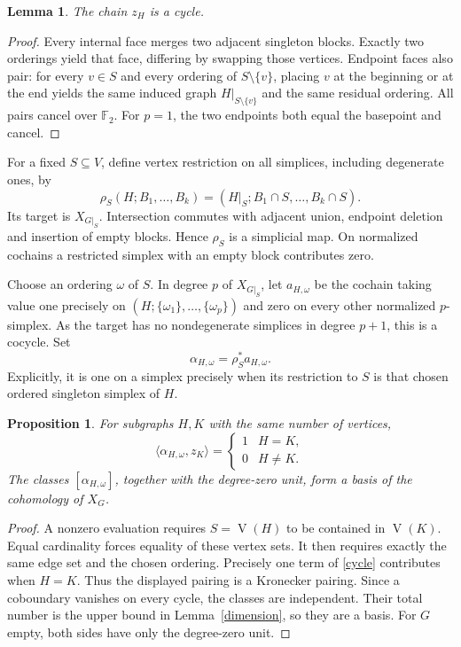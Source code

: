 \documentclass[11pt,a4paper]{article}
\newtheorem{lemma}[theorem]{Lemma}
\newtheorem{proposition}[theorem]{Proposition}
\newcommand{\F}{\mathbb F_2}
\newcommand{\verts}{\operatorname{V}}
\begin{document}
\begin{lemma}\label{cycles}
The chain $z_H$ is a cycle.
\end{lemma}
\begin{proof}
Every internal face merges two adjacent singleton blocks. Exactly two
orderings yield that face, differing by swapping those vertices. Endpoint
faces also pair: for every $v\in S$ and every ordering of $S\setminus\{v\}$,
placing $v$ at the beginning or at the end yields the same induced graph
$H|_{S\setminus\{v\}}$ and the same residual ordering. All pairs cancel over
$\F$. For $p=1$, the two endpoints both equal the basepoint and cancel.
\end{proof}

For a fixed $S\subseteq V$, define vertex restriction on all simplices,
including degenerate ones, by
\[
 \rho_S(H;B_1,\ldots,B_k)
  =(H|_S;B_1\cap S,\ldots,B_k\cap S).
\]
Its target is $X_{G|_S}$. Intersection commutes with adjacent union, endpoint
deletion and insertion of empty blocks. Hence $\rho_S$ is a simplicial map.
On normalized cochains a restricted simplex with an empty block contributes zero.

Choose an ordering $\omega$ of $S$. In degree $p$ of $X_{G|_S}$, let
$a_{H,\omega}$ be the cochain taking value one precisely on
$(H;\{\omega_1\},\ldots,\{\omega_p\})$ and zero on every other normalized
$p$-simplex. As the target has no nondegenerate simplices in degree $p+1$,
this is a cocycle. Set
\begin{equation}\label{cocycle}
 \alpha_{H,\omega}=\rho_S^*a_{H,\omega}.
\end{equation}
Explicitly, it is one on a simplex precisely when its restriction to $S$
is that chosen ordered singleton simplex of $H$.

\begin{proposition}\label{basis}
For subgraphs $H,K$ with the same number of vertices,
\[
 \langle\alpha_{H,\omega},z_K\rangle=\begin{cases}1&H=K,\\0&H\ne K.\end{cases}
\]
The classes $[\alpha_{H,\omega}]$, together with the degree-zero unit, form
a basis of the cohomology of $X_G$.
\end{proposition}
\begin{proof}
A nonzero evaluation requires $S=\verts(H)$ to be contained in $\verts(K)$.
Equal cardinality forces equality of these vertex sets. It then requires
exactly the same edge set and the chosen ordering. Precisely one term of
\eqref{cycle} contributes when $H=K$. Thus the displayed pairing is a
Kronecker pairing. Since a coboundary vanishes on every cycle, the classes
are independent. Their total number is the upper bound in
Lemma~\ref{dimension}, so they are a basis. For $G$ empty, both sides have
only the degree-zero unit.
\end{proof}
\end{document}
